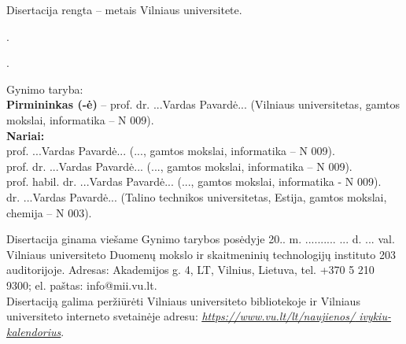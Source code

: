 \newpage
\thispagestyle{empty}                   %

\noindent\nohyphens{Disertacija rengta {\thesisPreparationStartYear}--{\thesisYear} metais Vilniaus universitete.}


\vspace{1cm}
.

.

\vspace{1cm}
\noindent
Gynimo taryba:  \\
{\bf Pirmininkas (-ė)} {-- {prof. dr. ...Vardas Pavardė...} (Vilniaus universitetas, gamtos mokslai, informatika -- N 009).\\}
{\bf Nariai:}\\ %
{prof. ...Vardas Pavardė...}
(..., gamtos mokslai, informatika -- N 009).\\
{prof. dr. ...Vardas Pavardė...}
(..., gamtos mokslai, informatika – N 009).\\
{prof. habil. dr. ...Vardas Pavardė...}
(..., gamtos mokslai, informatika - N 009).\\
{dr. ...Vardas Pavardė...}
(Talino technikos universitetas, Estija, gamtos mokslai, chemija -- N 003).


\vspace{2cm}
\noindent
Disertacija ginama viešame Gynimo tarybos posėdyje 20.. m. .......... ... d. ... val. Vilniaus universiteto Duomenų mokslo ir skaitmeninių technologijų instituto  203 auditorijoje. Adresas: Akademijos g. 4, LT, Vilnius, Lietuva, tel. +370 5 210 9300; el. paštas: info@mii.vu.lt.\\

\vspace{1cm}
\noindent
Disertaciją galima peržiūrėti Vilniaus universiteto bibliotekoje ir Vilniaus universiteto interneto svetainėje adresu: 
\href{https://www.vu.lt/lt/naujienos/ivykiu-kalendorius}{ \textit{\underline{https://www.vu.lt/lt/naujienos/} \underline{ivykiu-kalendorius}}}. 

